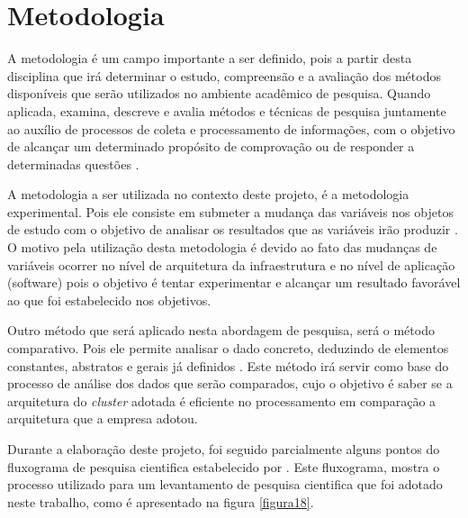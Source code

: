 \chapter[Metodologia]{Metodologia}

    A metodologia é um campo importante a ser definido, pois a partir desta disciplina que irá determinar o estudo, compreensão
    e a avaliação dos métodos disponíveis que serão utilizados no ambiente acadêmico de pesquisa. Quando aplicada, examina,
    descreve e avalia métodos e técnicas de pesquisa juntamente ao auxílio de processos de coleta e processamento de
    informações, com o objetivo de alcançar um determinado propósito de comprovação ou de responder a determinadas
    questões \cite{prodanov2013}.

    A metodologia a ser utilizada no contexto deste projeto, é a metodologia experimental. Pois ele consiste em submeter a
    mudança das variáveis nos objetos de estudo com o objetivo de analisar os resultados que as variáveis irão produzir
    \cite{gil2010}. O motivo pela utilização desta metodologia é devido ao fato das mudanças de variáveis ocorrer no nível
    de arquitetura da infraestrutura e no nível de aplicação (software) pois o objetivo é tentar experimentar e alcançar um
    resultado favorável ao que foi estabelecido nos objetivos.

    Outro método que será aplicado nesta abordagem de pesquisa, será o método comparativo. Pois ele permite analisar o dado
    concreto, deduzindo de elementos constantes, abstratos e gerais já definidos \cite{lakatos2010}. Este método irá servir como
    base do processo de análise dos dados que serão comparados, cujo o objetivo é saber se a arquitetura do \textit{cluster} adotada é
    eficiente no processamento em comparação a arquitetura que a empresa adotou.

    Durante a elaboração deste projeto, foi seguido parcialmente alguns pontos do fluxograma de pesquisa cientifica estabelecido
    por . Este fluxograma, mostra o processo utilizado para um levantamento de pesquisa cientifica
    que foi adotado neste trabalho, como é apresentado na figura \ref{figura18}.

